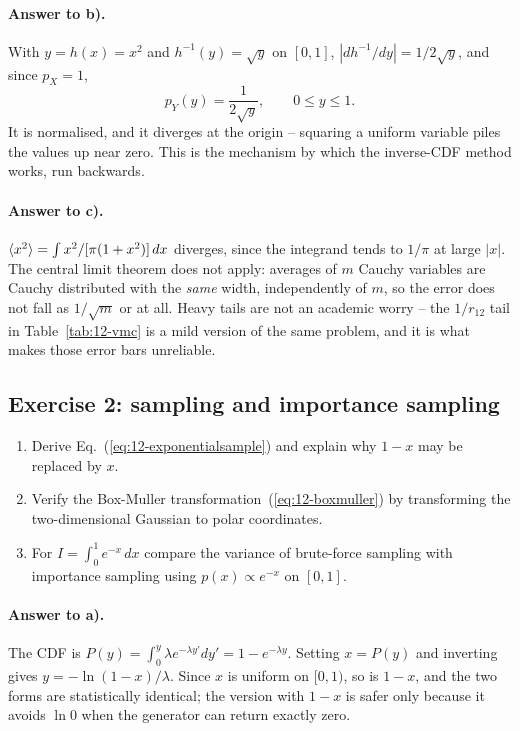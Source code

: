 \paragraph{Answer to b).}
With $y=h(x)=x^2$ and $h^{-1}(y)=\sqrt{y}$ on $[0,1]$,
$|dh^{-1}/dy|=1/2\sqrt{y}$, and since $p_X=1$,
\[
  p_Y(y) = \frac{1}{2\sqrt{y}},\qquad 0\le y\le 1 .
\]
It is normalised, and it diverges at the origin -- squaring a uniform variable
piles the values up near zero.  This is the mechanism by which the
inverse-CDF method works, run backwards.

\paragraph{Answer to c).}
$\langle x^2 \rangle=\int x^2/[\pi(1+x^2)]\,dx$ diverges, since the integrand tends to
$1/\pi$ at large $|x|$.  The central limit theorem does not apply: averages of
$m$ Cauchy variables are Cauchy distributed with the \emph{same} width,
independently of $m$, so the error does not fall as $1/\sqrt{m}$ or at all.
Heavy tails are not an academic worry -- the $1/r_{12}$ tail in
Table~\ref{tab:12-vmc} is a mild version of the same problem, and it is what
makes those error bars unreliable.

\subsection*{Exercise 2: sampling and importance sampling}
\label{ex:12-sampling}

\begin{enumerate}
  \item[a)] Derive Eq.~(\ref{eq:12-exponentialsample}) and explain why
  $1-x$ may be replaced by $x$.
  \item[b)] Verify the Box-Muller transformation~(\ref{eq:12-boxmuller}) by
  transforming the two-dimensional Gaussian to polar coordinates.
  \item[c)] For $I=\int_0^1 e^{-x}\,dx$ compare the variance of brute-force
  sampling with importance sampling using $p(x)\propto e^{-x}$ on $[0,1]$.
\end{enumerate}

\paragraph{Answer to a).}
The CDF is $P(y)=\int_0^y\lambda e^{-\lambda y'}dy'=1-e^{-\lambda y}$.
Setting $x=P(y)$ and inverting gives $y=-\ln(1-x)/\lambda$.  Since $x$ is
uniform on $[0,1)$, so is $1-x$, and the two forms are statistically
identical; the version with $1-x$ is safer only because it avoids $\ln 0$
when the generator can return exactly zero.

